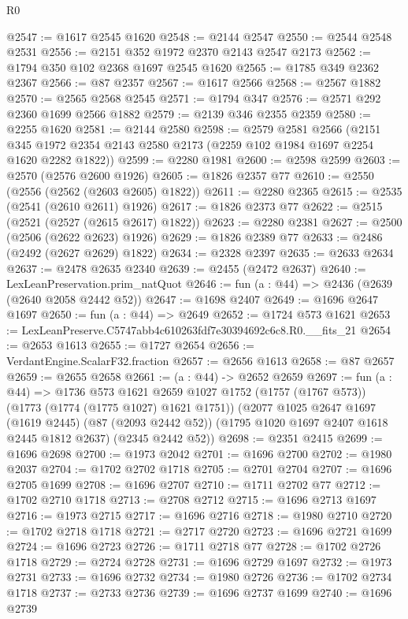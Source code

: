 \begin{lexlean}{R0}
\begin{coremodule}
@2547 := @1617 @2545 @1620
@2548 := @2144 @2547
@2550 := @2544 @2548 @2531
@2556 := @2151 @352 @1972 @2370 @2143 @2547 @2173
@2562 := @1794 @350 @102 @2368 @1697 @2545 @1620
@2565 := @1785 @349 @2362 @2367
@2566 := @87 @2357
@2567 := @1617 @2566
@2568 := @2567 @1882
@2570 := @2565 @2568 @2545
@2571 := @1794 @347
@2576 := @2571 @292 @2360 @1699 @2566 @1882
@2579 := @2139 @346 @2355 @2359
@2580 := @2255 @1620
@2581 := @2144 @2580
@2598 := @2579
    @2581
    @2566
    (@2151 @345 @1972 @2354 @2143 @2580 @2173 (@2259 @102 @1984 @1697 @2254 @1620 @2282 @1822))
@2599 := @2280 @1981
@2600 := @2598 @2599
@2603 := @2570 (@2576 @2600 @1926)
@2605 := @1826 @2357 @77
@2610 := @2550 (@2556 (@2562 (@2603 @2605) @1822))
@2611 := @2280 @2365
@2615 := @2535 (@2541 (@2610 @2611) @1926)
@2617 := @1826 @2373 @77
@2622 := @2515 (@2521 (@2527 (@2615 @2617) @1822))
@2623 := @2280 @2381
@2627 := @2500 (@2506 (@2622 @2623) @1926)
@2629 := @1826 @2389 @77
@2633 := @2486 (@2492 (@2627 @2629) @1822)
@2634 := @2328 @2397
@2635 := @2633 @2634
@2637 := @2478 @2635 @2340
@2639 := @2455 (@2472 @2637)
@2640 := LexLeanPreservation.prim_natQuot
@2646 := fun (a : @44) => @2436 (@2639 (@2640 @2058 @2442 @52))
@2647 := @1698 @2407
@2649 := @1696 @2647 @1697
@2650 := fun (a : @44) => @2649
@2652 := @1724 @573 @1621
@2653 := LexLeanPreserve.C5747abb4c610263fdf7e30394692c6c8.R0.__fits_21
@2654 := @2653 @1613
@2655 := @1727 @2654
@2656 := VerdantEngine.ScalarF32.fraction
@2657 := @2656 @1613
@2658 := @87 @2657
@2659 := @2655 @2658
@2661 := (a : @44) -> @2652 @2659
@2697 := fun (a : @44) =>
  @1736
    @573
    @1621
    @2659
    @1027
    @1752
    (@1757 (@1767 @573))
    (@1773 (@1774 (@1775 @1027) @1621 @1751))
    (@2077
      @1025
      @2647
      @1697
      (@1619 @2445)
      (@87 (@2093 @2442 @52))
      (@1795 @1020 @1697 @2407 @1618 @2445 @1812 @2637)
      (@2345 @2442 @52))
@2698 := @2351 @2415
@2699 := @1696 @2698
@2700 := @1973 @2042
@2701 := @1696 @2700
@2702 := @1980 @2037
@2704 := @1702 @2702 @1718
@2705 := @2701 @2704
@2707 := @1696 @2705 @1699
@2708 := @1696 @2707
@2710 := @1711 @2702 @77
@2712 := @1702 @2710 @1718
@2713 := @2708 @2712
@2715 := @1696 @2713 @1697
@2716 := @1973 @2715
@2717 := @1696 @2716
@2718 := @1980 @2710
@2720 := @1702 @2718 @1718
@2721 := @2717 @2720
@2723 := @1696 @2721 @1699
@2724 := @1696 @2723
@2726 := @1711 @2718 @77
@2728 := @1702 @2726 @1718
@2729 := @2724 @2728
@2731 := @1696 @2729 @1697
@2732 := @1973 @2731
@2733 := @1696 @2732
@2734 := @1980 @2726
@2736 := @1702 @2734 @1718
@2737 := @2733 @2736
@2739 := @1696 @2737 @1699
@2740 := @1696 @2739

\end{coremodule}
\end{lexlean}
